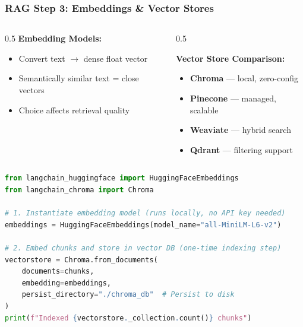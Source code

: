 \begin{frame}[fragile]\frametitle{RAG Step 3: Embeddings \& Vector Stores}

\begin{columns}
  \begin{column}{0.5\textwidth}
    \textbf{Embedding Models:}
    \begin{itemize}
    \item Convert text $\to$ dense float vector
    \item Semantically similar text = close vectors
    \item Choice affects retrieval quality
    \end{itemize}
  \end{column}
  \begin{column}{0.5\textwidth}
  
    \textbf{Vector Store Comparison:}
    \begin{itemize}
    \item \textbf{Chroma} --- local, zero-config
    \item \textbf{Pinecone} --- managed, scalable
    \item \textbf{Weaviate} --- hybrid search
    \item \textbf{Qdrant} --- filtering support
    \end{itemize}
  \end{column}
\end{columns}

\begin{lstlisting}[language=python,basicstyle=\tiny]
from langchain_huggingface import HuggingFaceEmbeddings
from langchain_chroma import Chroma

# 1. Instantiate embedding model (runs locally, no API key needed)
embeddings = HuggingFaceEmbeddings(model_name="all-MiniLM-L6-v2")

# 2. Embed chunks and store in vector DB (one-time indexing step)
vectorstore = Chroma.from_documents(
    documents=chunks,
    embedding=embeddings,
    persist_directory="./chroma_db"  # Persist to disk
)
print(f"Indexed {vectorstore._collection.count()} chunks")
\end{lstlisting}
\end{frame}


